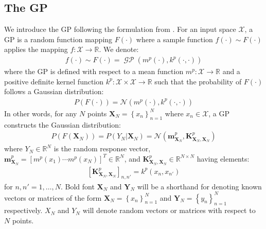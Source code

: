 \documentclass{article}
\newcommand{\GP}{\operatorname{\mathcal{GP}}}
\numberwithin{equation}{section}
\begin{document}
\subsection{The GP}\label{section:the-gp}
We introduce the GP following the formulation from \cite{rasmussen2003gaussian}. For an input space $\mathcal{X}$, a GP is a random function mapping $F(\cdot)$ where a sample function $f(\cdot) \sim F(\cdot)$ applies the mapping $f: \mathcal{X} \rightarrow \mathbb{R}$. We denote:
\begin{align}
    f(\cdot) \sim F(\cdot) = \GP\left(m^p(\cdot), k^p(\cdot, \cdot)\right)
    \label{gp}
\end{align}
where the GP is defined with respect to a mean function $m^p: \mathcal{X} \rightarrow \mathbb{R}$ and a positive definite kernel function $k^p: \mathcal{X} \times \mathcal{X} \rightarrow \mathbb{R}$ such that the probability of $F(\cdot)$ follows a Gaussian distribution:
\begin{align}
    P\left(F\left(\cdot \right)\right) =  \mathcal{N}(m^p(\cdot), k^p(\cdot, \cdot))
    \label{gp-normal}
\end{align}
In other words, for any $N$ points $\mathbf{X}_N = \left\{ x_n\right\}_{n=1}^N$ where $x_n \in \mathcal{X}$, a GP constructs the Gaussian distribution:
\begin{align}
    \label{gp-vector}
    P\left(F\left(\mathbf{X}_N\right)\right) = P\left(Y_N \vert \mathbf{X}_N\right) = \mathcal{N}\left(\mathbf{m}^p_{\mathbf{X}_N}, \mathbf{K}^{p}_{\mathbf{X}_N, \mathbf{X}_N}\right)
\end{align}
where $Y_N \in \mathbb{R}^{N}$ is the random response vector, $\mathbf{m}^p_{\mathbf{X}_N} = \left[ m^p(x_1) \cdots m^p(x_N)\right]^T \in \mathbb{R}^N$, and $\mathbf{K}^p_{\mathbf{X}_N, \mathbf{X}_N} \in \mathbb{R}^{N \times N}$ having elements:
\begin{align}
    \left[\mathbf{K}^p_{\mathbf{X}_N, \mathbf{X}_N}\right]_{n, n'} = k^p(x_n, x_{n'})
\end{align}
for $n, n'=1,\dots, N$. Bold font $\mathbf{X}_N$ and $\mathbf{Y}_N$ will be a shorthand for denoting known vectors or matrices of the form $\mathbf{X}_N = \left\{ x_n\right\}_{n=1}^N$ and $\mathbf{Y}_N = \left\{ y_n\right\}_{n=1}^N$ respectively. $X_N$ and $Y_N$ will denote random vectors or matrices with respect to $N$ points.
\end{document}
